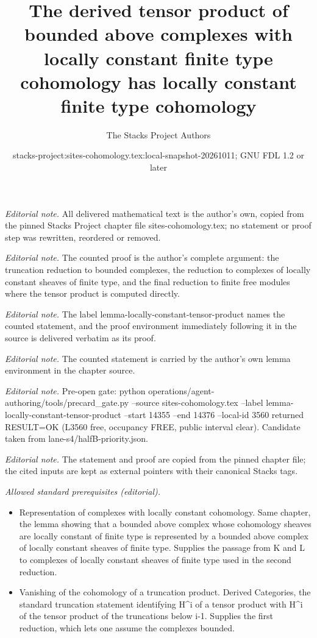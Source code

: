\documentclass[10pt,a4paper]{amsart}
\title{The derived tensor product of bounded above complexes with locally constant finite type cohomology has locally constant finite type cohomology}
\author{The Stacks Project Authors}
\date{stacks-project:sites-cohomology.tex:local-snapshot-20261011; GNU FDL 1.2 or later}
\theoremstyle{plain}
\theoremstyle{definition}
\theoremstyle{remark}
\numberwithin{equation}{subsection}
\begin{document}
\maketitle
\noindent\textit{Editorial note.} All delivered mathematical text is the author's own, copied from the pinned Stacks Project chapter file sites-cohomology.tex; no statement or proof step was rewritten, reordered or removed.\par\medskip
\noindent\textit{Editorial note.} The counted proof is the author's complete argument: the truncation reduction to bounded complexes, the reduction to complexes of locally constant sheaves of finite type, and the final reduction to finite free modules where the tensor product is computed directly.\par\medskip
\noindent\textit{Editorial note.} The label lemma-locally-constant-tensor-product names the counted statement, and the proof environment immediately following it in the source is delivered verbatim as its proof.\par\medskip
\noindent\textit{Editorial note.} The counted statement is carried by the author's own lemma environment in the chapter source.\par\medskip
\noindent\textit{Editorial note.} Pre-open gate: python operations/agent-authoring/tools/precard\_gate.py --source sites-cohomology.tex --label lemma-locally-constant-tensor-product --start 14355 --end 14376 --local-id 3560 returned RESULT=OK (L3560 free, occupancy FREE, public interval clear). Candidate taken from lane-s4/halfB-priority.json.\par\medskip
\noindent\textit{Editorial note.} The statement and proof are copied from the pinned chapter file; the cited inputs are kept as external pointers with their canonical Stacks tags.\par\medskip
\noindent\textit{Allowed standard prerequisites (editorial).}\begin{itemize}
\item Representation of complexes with locally constant cohomology. Same chapter, the lemma showing that a bounded above complex whose cohomology sheaves are locally constant of finite type is represented by a bounded above complex of locally constant sheaves of finite type. Supplies the passage from K and L to complexes of locally constant sheaves of finite type used in the second reduction.
\item Vanishing of the cohomology of a truncation product. Derived Categories, the standard truncation statement identifying H\textasciicircum{}i of a tensor product with H\textasciicircum{}i of the tensor product of the truncations below i-1. Supplies the first reduction, which lets one assume the complexes bounded.
\end{itemize}\medskip
\end{document}
